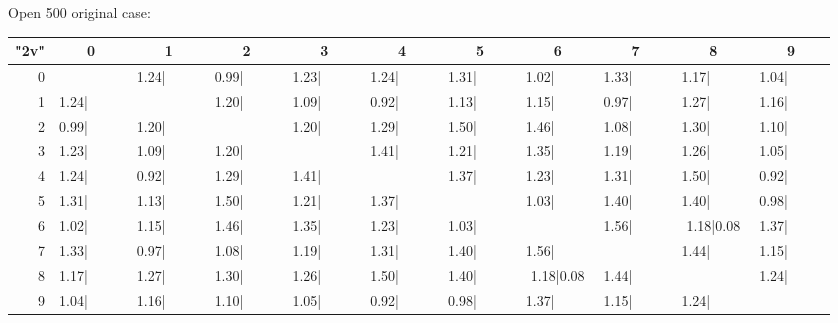 \begin{table}
	
	Open 500 original case:
		
	\vspace{0.6cm}
	
	
	\begin{tabular}{|r||c|c|c|c|c|c|c|c|c|c|}\hline
		{\bf "2v"} & 0 & 1 & 2 & 3 & 4 & 5 & 6 & 7 & 8 & 9 \\\hline\hline
0 & &1.24|\ \ \ \ \  &0.99|\ \ \ \ \  &1.23|\ \ \ \ \  &1.24|\ \ \ \ \  &1.31|\ \ \ \ \  &1.02|\ \ \ \ \  &1.33|\ \ \ \ \  &1.17|\ \ \ \ \  &1.04|\ \ \ \ \   \\\hline
1 &1.24|\ \ \ \ \  & &1.20|\ \ \ \ \  &1.09|\ \ \ \ \  &0.92|\ \ \ \ \  &1.13|\ \ \ \ \  &1.15|\ \ \ \ \  &0.97|\ \ \ \ \  &1.27|\ \ \ \ \  &1.16|\ \ \ \ \   \\\hline
2 &0.99|\ \ \ \ \  &1.20|\ \ \ \ \  & &1.20|\ \ \ \ \  &1.29|\ \ \ \ \  &1.50|\ \ \ \ \  &1.46|\ \ \ \ \  &1.08|\ \ \ \ \  &1.30|\ \ \ \ \  &1.10|\ \ \ \ \   \\\hline
3 &1.23|\ \ \ \ \  &1.09|\ \ \ \ \  &1.20|\ \ \ \ \  & &1.41|\ \ \ \ \  &1.21|\ \ \ \ \  &1.35|\ \ \ \ \  &1.19|\ \ \ \ \  &1.26|\ \ \ \ \  &1.05|\ \ \ \ \   \\\hline
4 &1.24|\ \ \ \ \  &0.92|\ \ \ \ \  &1.29|\ \ \ \ \  &1.41|\ \ \ \ \  & &1.37|\ \ \ \ \  &1.23|\ \ \ \ \  &1.31|\ \ \ \ \  &1.50|\ \ \ \ \  &0.92|\ \ \ \ \   \\\hline
5 &1.31|\ \ \ \ \  &1.13|\ \ \ \ \  &1.50|\ \ \ \ \  &1.21|\ \ \ \ \  &1.37|\ \ \ \ \  & &1.03|\ \ \ \ \  &1.40|\ \ \ \ \  &1.40|\ \ \ \ \  &0.98|\ \ \ \ \   \\\hline
6 &1.02|\ \ \ \ \  &1.15|\ \ \ \ \  &1.46|\ \ \ \ \  &1.35|\ \ \ \ \  &1.23|\ \ \ \ \  &1.03|\ \ \ \ \  & &1.56|\ \ \ \ \  &1.18|0.08 &1.37|\ \ \ \ \   \\\hline
7 &1.33|\ \ \ \ \  &0.97|\ \ \ \ \  &1.08|\ \ \ \ \  &1.19|\ \ \ \ \  &1.31|\ \ \ \ \  &1.40|\ \ \ \ \  &1.56|\ \ \ \ \  & &1.44|\ \ \ \ \  &1.15|\ \ \ \ \   \\\hline
8 &1.17|\ \ \ \ \  &1.27|\ \ \ \ \  &1.30|\ \ \ \ \  &1.26|\ \ \ \ \  &1.50|\ \ \ \ \  &1.40|\ \ \ \ \  &1.18|0.08 &1.44|\ \ \ \ \  & &1.24|\ \ \ \ \   \\\hline
9 &1.04|\ \ \ \ \  &1.16|\ \ \ \ \  &1.10|\ \ \ \ \  &1.05|\ \ \ \ \  &0.92|\ \ \ \ \  &0.98|\ \ \ \ \  &1.37|\ \ \ \ \  &1.15|\ \ \ \ \  &1.24|\ \ \ \ \  &  \\\hline
	\end{tabular}
	

\end{table}
